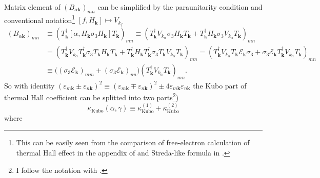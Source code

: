\documentclass[10pt,nofootinbib]{revtex4}
\begin{document}
		Matrix element of $(B_{\alpha\bm{k}})_{mn}$ can be simplified by the paraunitarity condition and conventional notation\footnote{This can be easily seen from the comparison of free-electron calculation of thermal Hall effect in the appendix of \cite{kapustin2019thermal} and Streda-like formula in \cite{streda1982theory,smrcka1977transport}.} $[f,H_{\bm{k}}]\mapsto V_{k_f}$
		\begin{align*}
			(B_{\alpha\bm{k}})_{mn}&\equiv\left(T^\dagger_{\bm{k}}[\alpha,H_{\bm{k}}\sigma_3 H_{\bm{k}}]T_{\bm{k}}\right)_{mn}\equiv \left(T_{\bm{k}}^\dagger V_{k_\alpha}\sigma_3 H_{\bm{k}}T_{\bm{k}}+T^\dagger_{\bm{k}}H_{\bm{k}}\sigma_3V_{k_\alpha}T_{\bm{k}}\right)_{mn}\\
			&=\left(T_{\bm{k}}^\dagger V_{k_\alpha}T^\dagger_{\bm{k}}\sigma_3 T_{\bm{k}}H_{\bm{k}}T_{\bm{k}}+T^\dagger_{\bm{k}}H_{\bm{k}}T^\dagger_{\bm{k}}\sigma_3 T_{\bm{k}}V_{k_\alpha}T_{\bm{k}}\right)_{mn}=\left(T_{\bm{k}}^\dagger V_{k_\alpha}T_{\bm{k}}\mathscr{E}_{\bm{k}}\sigma_3+\sigma_3\mathscr{E}_{\bm{k}}T^\dagger_{\bm{k}}V_{k_\alpha}T_{\bm{k}}\right)_{mn}\\
			&\equiv \big((\sigma_3\mathscr{E}_{\bm{k}})_{mm}+(\sigma_3\mathscr{E}_{\bm{k}})_{nn}\big)(T^\dagger_{\bm{k}}V_{k_\alpha}T_{\bm{k}})_{mn}.
		\end{align*}
		So with identity $(\varepsilon_{m\bm{k}}\pm \varepsilon_{n\bm{k}})^2\equiv(\varepsilon_{m\bm{k}}\mp\varepsilon_{n\bm{k}})^2\pm4 \varepsilon_{m\bm{k}}\varepsilon_{n\bm{k}}$ the Kubo part of thermal Hall coefficient can be splitted into two parts\footnote{I follow the notation with \cite{matsumoto2014thermal}.})
		\begin{equation*}
			\kappa_{\text{Kubo}}(\alpha,\gamma)\equiv\kappa_{\text{Kubo}}^{(1)}+\kappa_{\text{Kubo}}^{(2)}
		\end{equation*}
		where
\end{document}
